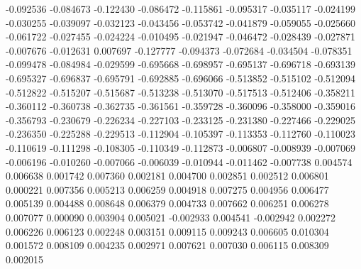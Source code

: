-0.092536
-0.084673
-0.122430
-0.086472
-0.115861
-0.095317
-0.035117
-0.024199
-0.030255
-0.039097
-0.032123
-0.043456
-0.053742
-0.041879
-0.059055
-0.025660
-0.061722
-0.027455
-0.024224
-0.010495
-0.021947
-0.046472
-0.028439
-0.027871
-0.007676
-0.012631
0.007697
-0.127777
-0.094373
-0.072684
-0.034504
-0.078351
-0.099478
-0.084984
-0.029599
-0.695668
-0.698957
-0.695137
-0.696718
-0.693139
-0.695327
-0.696837
-0.695791
-0.692885
-0.696066
-0.513852
-0.515102
-0.512094
-0.512822
-0.515207
-0.515687
-0.513238
-0.513070
-0.517513
-0.512406
-0.358211
-0.360112
-0.360738
-0.362735
-0.361561
-0.359728
-0.360096
-0.358000
-0.359016
-0.356793
-0.230679
-0.226234
-0.227103
-0.233125
-0.231380
-0.227466
-0.229025
-0.236350
-0.225288
-0.229513
-0.112904
-0.105397
-0.113353
-0.112760
-0.110023
-0.110619
-0.111298
-0.108305
-0.110349
-0.112873
-0.006807
-0.008939
-0.007069
-0.006196
-0.010260
-0.007066
-0.006039
-0.010944
-0.011462
-0.007738
0.004574
0.006638
0.001742
0.007360
0.002181
0.004700
0.002851
0.002512
0.006801
0.000221
0.007356
0.005213
0.006259
0.004918
0.007275
0.004956
0.006477
0.005139
0.004488
0.008648
0.006379
0.004733
0.007662
0.006251
0.006278
0.007077
0.000090
0.003904
0.005021
-0.002933
0.004541
-0.002942
0.002272
0.006226
0.006123
0.002248
0.003151
0.009115
0.009243
0.006605
0.010304
0.001572
0.008109
0.004235
0.002971
0.007621
0.007030
0.006115
0.008309
0.002015
